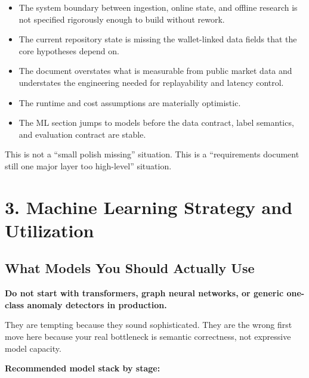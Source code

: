 \documentclass[11pt,letterpaper]{article}
\begin{document}
\begin{itemize}[nosep]
    \item The system boundary between ingestion, online state, and offline research is not specified rigorously enough to build without rework.
    \item The current repository state is missing the wallet-linked data fields that the core hypotheses depend on.
    \item The document overstates what is measurable from public market data and understates the engineering needed for replayability and latency control.
    \item The runtime and cost assumptions are materially optimistic.
    \item The ML section jumps to models before the data contract, label semantics, and evaluation contract are stable.
\end{itemize}

This is not a ``small polish missing'' situation. This is a ``requirements document still one major layer too high-level'' situation.

\section{3. Machine Learning Strategy and Utilization}

\subsection{What Models You Should Actually Use}

\textbf{Do not start with transformers, graph neural networks, or generic one-class anomaly detectors in production.}

They are tempting because they sound sophisticated. They are the wrong first move here because your real bottleneck is semantic correctness, not expressive model capacity.

\textbf{Recommended model stack by stage:}
\end{document}
